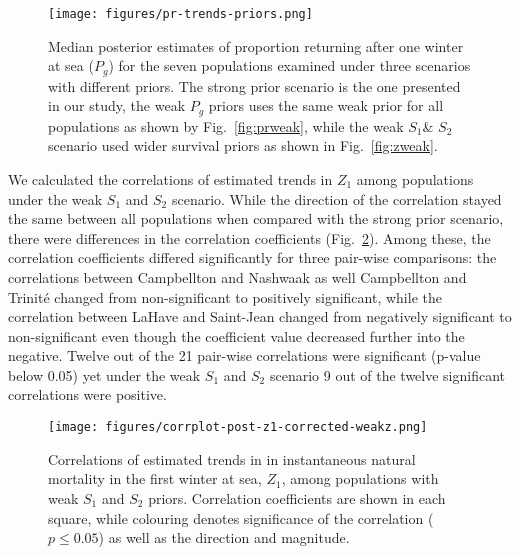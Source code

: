 \documentclass[12pt]{article}
\newcommand{\So}{$S_{1}$\xspace}
\newcommand{\St}{$S_{2}$\xspace}
\newcommand{\Pg}{$P_g$\xspace}
\begin{document}
\begin{figure}[htbp] \centering
    \texttt{[image: figures/pr-trends-priors.png]}
    \caption{Median posterior estimates of proportion returning after one winter at sea 
        (\Pg) for the seven populations examined under three scenarios with
        different priors. The strong prior scenario is the one presented in
        our study, the weak \Pg priors uses the same weak prior for all
        populations as shown by Fig.~\ref{fig:prweak}, while the weak \So \&
        \St scenario used wider survival priors as shown in Fig.~\ref{fig:zweak}.} 
    \label{fig:pr-trends-priors} \end{figure}

We calculated the correlations of estimated trends in $Z_1$ among populations
under the weak \So and \St scenario. While the direction of the correlation
stayed the same between all populations when compared with the strong prior
scenario, there were differences in the correlation coefficients (Fig.~\ref{fig:s1-corr-weakz}).
Among these, the correlation coefficients differed significantly for three pair-wise
comparisons: the correlations between Campbellton and Nashwaak as well
Campbellton and Trinité changed from non-significant to positively
significant, while the correlation between LaHave and Saint-Jean changed from negatively significant to
non-significant even though the coefficient value decreased further into the
negative.
Twelve out of the 21 pair-wise correlations were significant (p-value below 0.05) yet under the  
weak \So and \St scenario 9 out of the twelve significant correlations were positive.

\begin{figure}[htbp] \centering
    \texttt{[image: figures/corrplot-post-z1-corrected-weakz.png]} \caption{
        Correlations of estimated trends in in instantaneous natural mortality in the first winter at sea, $Z_1$, among populations with weak \So and
\St priors. Correlation coefficients are shown in each square, while colouring
        denotes significance of the correlation ($p \leq 0.05$) as well as the direction and magnitude.}
\label{fig:s1-corr-weakz}
\end{figure}




\end{document}
